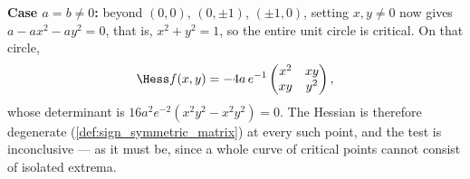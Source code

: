 \begin{exercisesolution}
\textbf{Case $a=b\neq0$:} beyond $(0,0)$, $(0,\pm1)$, $(\pm1,0)$, setting $x,y\neq0$ now gives
$a-ax^2-ay^2=0$, that is, $x^2+y^2=1$, so the entire unit circle is critical. On that circle,
\[\Hess f(x,y) = -4a\,e^{-1}\begin{pmatrix} x^2 & xy \\ xy & y^2 \end{pmatrix},\]
whose determinant is $16a^2e^{-2}(x^2y^2 - x^2y^2) = 0$. The Hessian is therefore degenerate
(\cref{def:sign_symmetric_matrix}) at every such point, and the test is inconclusive --- as it
must be, since a whole curve of critical points cannot consist of isolated extrema.
\end{exercisesolution}
